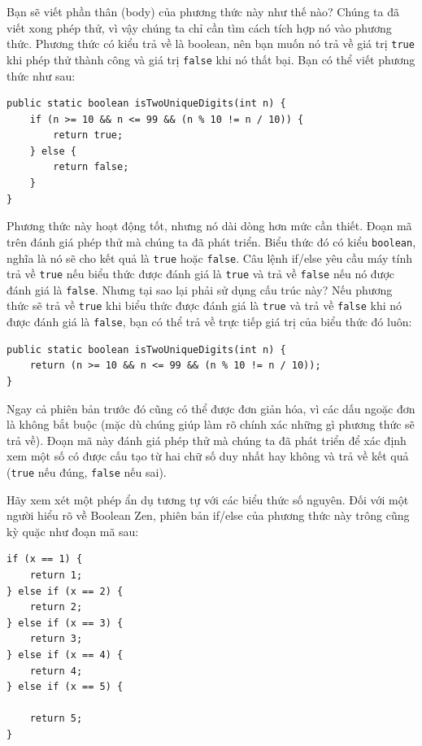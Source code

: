 Bạn sẽ viết phần thân (body) của phương thức này như thế nào? Chúng ta đã viết xong phép thử, vì vậy chúng ta chỉ cần tìm cách tích hợp nó vào phương thức. Phương thức có kiểu trả về là boolean, nên bạn muốn nó trả về giá trị \texttt{true} khi phép thử thành công và giá trị \texttt{false} khi nó thất bại. Bạn có thể viết phương thức như sau:

\begin{verbatim}
public static boolean isTwoUniqueDigits(int n) {
    if (n >= 10 && n <= 99 && (n % 10 != n / 10)) {
        return true;
    } else {
        return false;
    }
}
\end{verbatim}

Phương thức này hoạt động tốt, nhưng nó dài dòng hơn mức cần thiết. Đoạn mã trên đánh giá phép thử mà chúng ta đã phát triển. Biểu thức đó có kiểu \texttt{boolean}, nghĩa là nó sẽ cho kết quả là \texttt{true} hoặc \texttt{false}. Câu lệnh if/else yêu cầu máy tính trả về \texttt{true} nếu biểu thức được đánh giá là \texttt{true} và trả về \texttt{false} nếu nó được đánh giá là \texttt{false}. Nhưng tại sao lại phải sử dụng cấu trúc này? Nếu phương thức sẽ trả về \texttt{true} khi biểu thức được đánh giá là \texttt{true} và trả về \texttt{false} khi nó được đánh giá là \texttt{false}, bạn có thể trả về trực tiếp giá trị của biểu thức đó luôn:

\begin{verbatim}
public static boolean isTwoUniqueDigits(int n) {
    return (n >= 10 && n <= 99 && (n % 10 != n / 10));
}
\end{verbatim}

Ngay cả phiên bản trước đó cũng có thể được đơn giản hóa, vì các dấu ngoặc đơn là không bắt buộc (mặc dù chúng giúp làm rõ chính xác những gì phương thức sẽ trả về). Đoạn mã này đánh giá phép thử mà chúng ta đã phát triển để xác định xem một số có được cấu tạo từ hai chữ số duy nhất hay không và trả về kết quả (\texttt{true} nếu đúng, \texttt{false} nếu sai).

Hãy xem xét một phép ẩn dụ tương tự với các biểu thức số nguyên. Đối với một người hiểu rõ về Boolean Zen, phiên bản if/else của phương thức này trông cũng kỳ quặc như đoạn mã sau:

\begin{verbatim}
if (x == 1) {
    return 1;
} else if (x == 2) {
    return 2;
} else if (x == 3) {
    return 3;
} else if (x == 4) {
    return 4;
} else if (x == 5) {

    return 5;
}
\end{verbatim}

